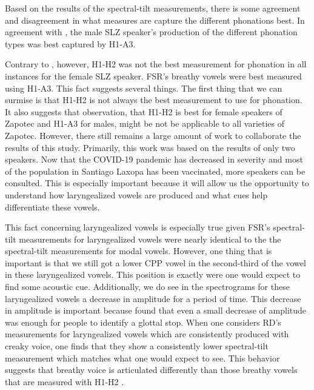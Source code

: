 \documentclass[12pt, letterpaper]{article}
\begin{document}
Based on the results of the spectral-tilt measurements, there is some agreement and disagreement in what measures are capture the different phonations best. In agreement with \citet{espositoVariationContrastivePhonation2010}, the male SLZ speaker's production of the different phonation types was best captured by H1-A3. 

Contrary to \citet{espositoVariationContrastivePhonation2010}, however, H1-H2 was not the best measurement for phonation in all instances for the female SLZ speaker. FSR's breathy vowels were best measured using H1-A3. This fact suggests several things. The first thing that we can surmise is that H1-H2 is not always the best measurement to use for phonation. It also suggests that  observation, that H1-H2 is best for female speakers of Zapotec and H1-A3 for males, might be not be applicable to all varieties of Zapotec. However, there still remains a large amount of work to collaborate the results of this study. Primarily, this work was based on the results of only two speakers. Now that the COVID-19 pandemic has decreased in severity and most of the population in Santiago Laxopa has been vaccinated, more speakers can be consulted. This is especially important because it will allow us the opportunity to understand how laryngealized vowels are produced and what cues help differentiate these vowels. 

This fact concerning laryngealized vowels is especially true given FSR's spectral-tilt measurements for laryngealized vowels were nearly identical to the the spectral-tilt measurements for modal vowels. However, one thing that is important is that we still got a lower CPP vowel in the second-third of the vowel in these laryngealized vowels. This position is exactly were one would expect to find some acoustic cue. Additionally, we do see in the spectrograms for these laryngealized vowels a decrease in amplitude for a period of time. This decrease in amplitude is important because \citet{gerfenProductionPerceptionLaryngealized2005} found that even a small decrease of amplitude was enough for people to identify a glottal stop. When one considers RD's measurements for laryngealized vowels which are consistently produced with creaky voice, one finds that they show a consistently lower spectral-tilt measurement which matches what one would expect to see. This behavior suggests that breathy voice is articulated differently than those breathy vowels that are measured with H1-H2 \citep{espositoVariationContrastivePhonation2010}. 
\end{document}
